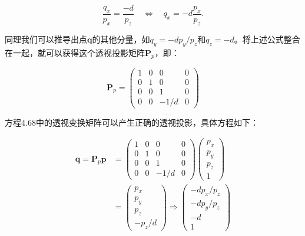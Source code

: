 \documentclass[
  paper=a4,
  ,captions=tableheading
]{scrartcl}
\begin{document}
\[
  \frac{q_{x}}{p_{x}}=\frac{-d}{p_{z}} \quad
  \Longleftrightarrow
  \quad q_{x}=-d \frac{p_{x}}{p_{z}}.
  \tag{4.67}
\]

同理我们可以推导出点\(\mathbf{q}\)的其他分量，如\(q_{y}=-d p_{y} / p_{z}\)和\(q_{z}=-d\)。将上述公式整合在一起，就可以获得这个透视投影矩阵\(\mathbf{P}_p\)，即：

\[
  \mathbf{P}_{p}=
  \left(\begin{array}{cccc}
      1 & 0 & 0      & 0 \\
      0 & 1 & 0      & 0 \\
      0 & 0 & 1      & 0 \\
      0 & 0 & -1 / d & 0
    \end{array}\right)
  \tag{4.68}
\]

方程4.68中的透视变换矩阵可以产生正确的透视投影，具体方程如下：

\[
  \begin{array}{cc}
    \mathbf{q}=\mathbf{P}_{p} \mathbf{p} & =
    \left(\begin{array}{cccc}
              1 & 0 & 0      & 0 \\
              0 & 1 & 0      & 0 \\
              0 & 0 & 1      & 0 \\
              0 & 0 & -1 / d & 0
            \end{array}\right)
    \left(\begin{array}{c}
              p_{x} \\ p_{y} \\ p_{z} \\ 1
            \end{array}\right)                                            \\[2mm]
                                         & =\left(\begin{array}{c}p_{x}
                                                      \\ p_{y} \\ p_{z} \\ -p_{z} / d
                                                    \end{array}\right)
    \Rightarrow
    \left(\begin{array}{c}
              -d p_{x} / p_{z} \\ -d p_{y} / p_{z} \\ -d \\ 1
            \end{array}\right)
  \end{array}
  \tag{4.69}
\]
\end{document}
